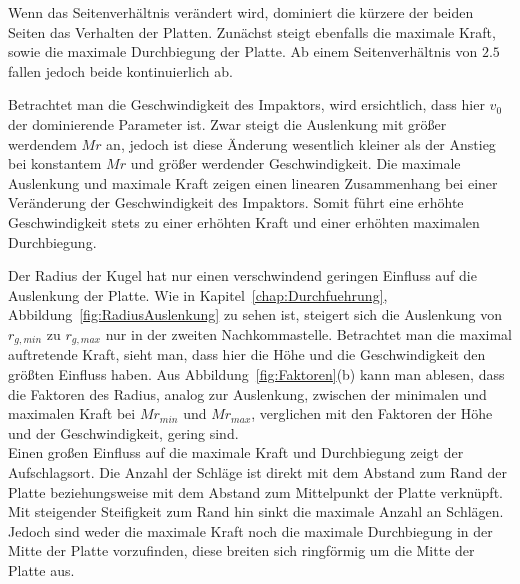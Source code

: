 Wenn das Seitenverhältnis verändert wird, dominiert die kürzere der beiden Seiten das Verhalten der Platten. Zunächst steigt ebenfalls die maximale Kraft, sowie die maximale Durchbiegung der Platte. Ab einem Seitenverhältnis von $2.5$ fallen jedoch beide kontinuierlich ab.

Betrachtet man die Geschwindigkeit des Impaktors, wird ersichtlich, dass hier $v_{0}$ der dominierende Parameter ist. Zwar steigt die Auslenkung mit größer werdendem $Mr$ an, jedoch ist diese Änderung wesentlich kleiner als der Anstieg bei konstantem $Mr$ und größer werdender Geschwindigkeit. Die maximale Auslenkung und maximale Kraft zeigen einen linearen Zusammenhang bei einer Veränderung der Geschwindigkeit des Impaktors. Somit führt eine erhöhte Geschwindigkeit stets zu einer erhöhten Kraft und einer erhöhten maximalen Durchbiegung.

Der Radius der Kugel hat nur einen verschwindend geringen Einfluss auf die Auslenkung der Platte. Wie in Kapitel~\ref{chap:Durchfuehrung}, Abbildung~\ref{fig:RadiusAuslenkung} zu sehen ist, steigert sich die Auslenkung von $r_{g,min}$ zu $r_{g,max}$ nur in der zweiten Nachkommastelle.
Betrachtet man die maximal auftretende Kraft, sieht man, dass hier die Höhe und die Geschwindigkeit den größten Einfluss haben. Aus Abbildung~\ref{fig:Faktoren}(b) kann man ablesen, dass die Faktoren des Radius, analog zur Auslenkung, zwischen der minimalen und maximalen Kraft bei $Mr_{min}$ und $Mr_{max}$, verglichen mit den Faktoren der Höhe und der Geschwindigkeit, gering sind. \\

Einen großen Einfluss auf die maximale Kraft und Durchbiegung zeigt der Aufschlagsort.
Die Anzahl der Schläge ist direkt mit dem Abstand zum Rand der Platte beziehungsweise mit dem Abstand zum Mittelpunkt der Platte verknüpft. Mit steigender Steifigkeit zum Rand hin sinkt die maximale Anzahl an Schlägen. Jedoch sind weder die maximale Kraft noch die maximale Durchbiegung in der Mitte der Platte vorzufinden, diese breiten sich ringförmig um die Mitte der Platte aus.


